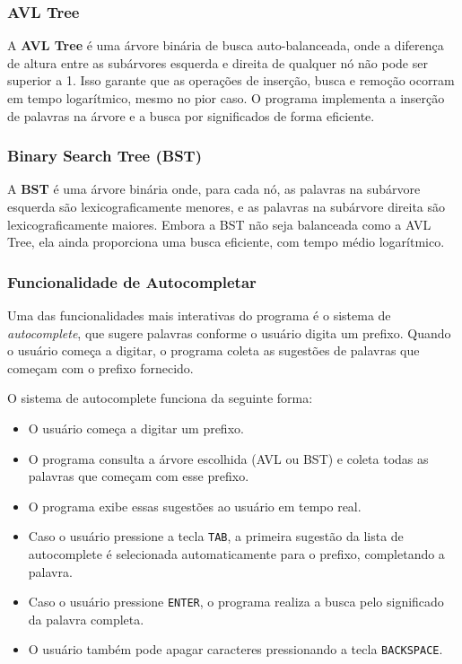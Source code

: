 \documentclass{article}
\begin{document}
\subsubsection{AVL Tree}
A \textbf{AVL Tree} é uma árvore binária de busca auto-balanceada, onde a diferença de altura entre as subárvores esquerda e direita de qualquer nó não pode ser superior a 1. Isso garante que as operações de inserção, busca e remoção ocorram em tempo logarítmico, mesmo no pior caso. O programa implementa a inserção de palavras na árvore e a busca por significados de forma eficiente.

\subsubsection{Binary Search Tree (BST)}
A \textbf{BST} é uma árvore binária onde, para cada nó, as palavras na subárvore esquerda são lexicograficamente menores, e as palavras na subárvore direita são lexicograficamente maiores. Embora a BST não seja balanceada como a AVL Tree, ela ainda proporciona uma busca eficiente, com tempo médio logarítmico.

\subsubsection{Funcionalidade de Autocompletar}
Uma das funcionalidades mais interativas do programa é o sistema de \textit{autocomplete}, que sugere palavras conforme o usuário digita um prefixo. Quando o usuário começa a digitar, o programa coleta as sugestões de palavras que começam com o prefixo fornecido.

O sistema de autocomplete funciona da seguinte forma:
\begin{itemize}
    \item O usuário começa a digitar um prefixo.
    \item O programa consulta a árvore escolhida (AVL ou BST) e coleta todas as palavras que começam com esse prefixo.
    \item O programa exibe essas sugestões ao usuário em tempo real.
    \item Caso o usuário pressione a tecla \texttt{TAB}, a primeira sugestão da lista de autocomplete é selecionada automaticamente para o prefixo, completando a palavra.
    \item Caso o usuário pressione \texttt{ENTER}, o programa realiza a busca pelo significado da palavra completa.
    \item O usuário também pode apagar caracteres pressionando a tecla \texttt{BACKSPACE}.
\end{itemize}
\end{document}
